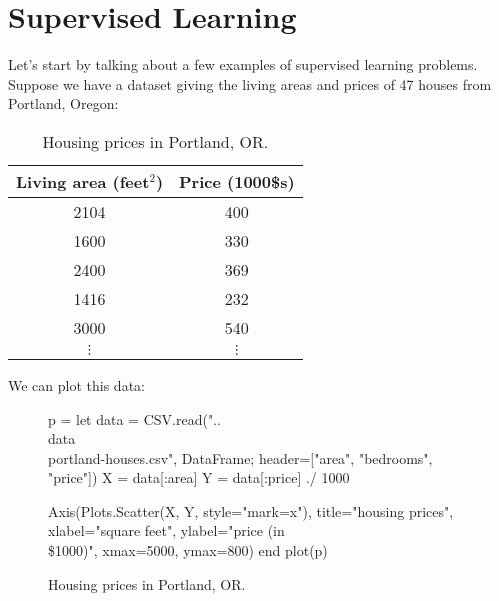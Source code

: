 \titlespacing*{\part}{0pt}{-20pt}{30pt} %
\titlespacing*{\chapter}{0pt}{-10pt}{30pt}

\part{Supervised Learning} %
\label{part:supervised_learning}



Let's start by talking about a few examples of supervised learning problems.
Suppose we have a dataset giving the living areas and prices of 47 houses
from Portland, Oregon:

\begin{table}[!h]
  \centering
  \caption{
    \label{tab:houses} Housing prices in Portland, OR.
  }
  \begin{tabular}{cc}
    \toprule
    Living area (feet$^2$) & Price (1000\$s) \\
    \midrule
    2104 & 400 \\
    1600 & 330 \\
    2400 & 369 \\
    1416 & 232 \\
    3000 & 540 \\
    $\vdots$ & $\vdots$ \\
    \bottomrule
  \end{tabular}
\end{table}

\phantom{} %

We can plot this data:
\begin{figure}
    \caption{
        \label{fig:houses} Housing prices in Portland, OR.
    }
    \begin{jlcode}
    p = let
        data = CSV.read("..\\data\\portland-houses.csv", DataFrame; header=["area", "bedrooms", "price"])
        X = data[:area]
        Y = data[:price] ./ 1000

        Axis(Plots.Scatter(X, Y, style="mark=x"), title="housing prices", xlabel="square feet", ylabel="price (in \\\$1000)", xmax=5000, ymax=800)
    end
    plot(p)
    \end{jlcode}
    \begin{center}
    \end{center}
\end{figure}


